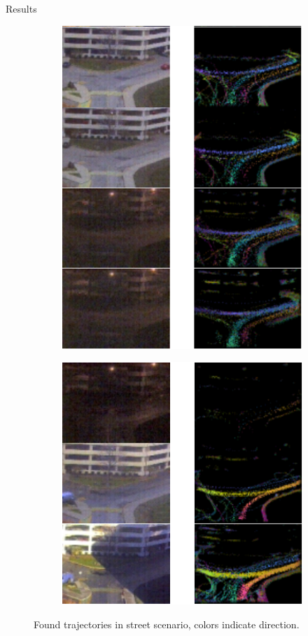 \documentclass{beamer}
\begin{document}
\begin{frame}{Results}
\begin{figure}
  \centering
  \begin{subfigure}[t!]{0.45\textwidth}
    \centering
    \includegraphics[scale=0.45]{tracker_4figs.png}
  \end{subfigure}\quad \begin{subfigure}[t!]{0.45\textwidth}
    \centering
    \includegraphics[scale=0.45]{tracker_3figs.png}
    \vspace{1.525cm}
  \end{subfigure}
      \vspace{-1mm}
  \caption*{Found trajectories in street scenario, colors indicate direction.}
\end{figure}
\end{frame}
\end{document}
